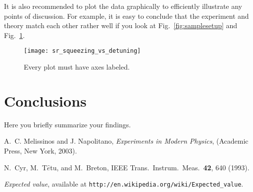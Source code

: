 \documentclass[letterpaper,12pt]{article}
\begin{document}
It is also recommended to plot the data graphically to efficiently illustrate
any points of discussion. For example, it is easy to conclude that the
experiment and theory match each other rather well if you look at
Fig.~\ref{fig:samplesetup} and Fig.~\ref{fig:exp_plots}.

\begin{figure}[ht] 
  \centering
      \texttt{[image: sr\_squeezing\_vs\_detuning]}

        \caption{
                \label{fig:exp_plots}  
                Every plot must have axes labeled.
        }
\end{figure}


\section{Conclusions}
Here you briefly summarize your findings.


\begin{thebibliography}{99}

A.~C. Melissinos and J. Napolitano, \textit{Experiments in Modern Physics},
(Academic Press, New York, 2003).

N.\ Cyr, M.\ T$\hat{e}$tu, and M.\ Breton,
IEEE Trans.\ Instrum.\ Meas.\ \textbf{42}, 640 (1993).

 \emph{Expected value},  available at
\texttt{http://en.wikipedia.org/wiki/Expected\_value}.

\end{thebibliography}
\end{document}
